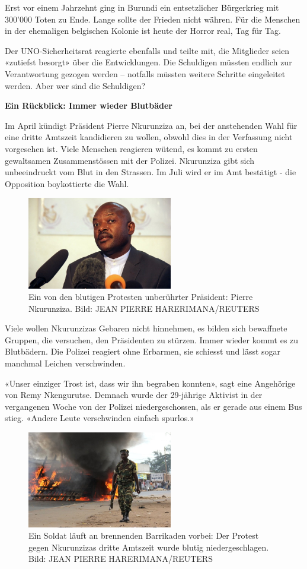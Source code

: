 \documentclass{article}
\begin{document}
	Erst vor einem Jahrzehnt ging in Burundi ein entsetzlicher Bürgerkrieg mit 300'000 Toten zu Ende. Lange sollte der Frieden nicht währen. Für die Menschen in der ehemaligen belgischen Kolonie ist heute der Horror real, Tag für Tag.
	
	Der UNO-Sicherheitsrat reagierte ebenfalls und teilte mit, die Mitglieder seien «zutiefst besorgt» über die Entwicklungen. Die Schuldigen müssten endlich zur Verantwortung gezogen werden – notfalls müssten weitere Schritte eingeleitet werden. Aber wer sind die Schuldigen?
	
	\textbf{Ein Rückblick: Immer wieder Blutbäder}
	
	Im April kündigt Präsident Pierre Nkurunziza an, bei der anstehenden Wahl für eine dritte Amtszeit kandidieren zu wollen, obwohl dies in der Verfassung nicht vorgesehen ist. Viele Menschen reagieren wütend, es kommt zu ersten gewaltsamen Zusammenstössen mit der Polizei. Nkurunziza gibt sich unbeeindruckt vom Blut in den Strassen. Im Juli wird er im Amt bestätigt - die Opposition boykottierte die Wahl.
	
	
	\begin{figure}
		  \centering
		\includegraphics[width=180pt]{img/img3}
		\caption{Ein von den blutigen Protesten unberührter Präsident: Pierre Nkurunziza. Bild: JEAN PIERRE HARERIMANA/REUTERS}
	\end{figure}
	
	Viele wollen Nkurunzizas Gebaren nicht hinnehmen, es bilden sich bewaffnete Gruppen, die versuchen, den Präsidenten zu stürzen. Immer wieder kommt es zu Blutbädern. Die Polizei reagiert ohne Erbarmen, sie schiesst und lässt sogar manchmal Leichen verschwinden.
	
	«Unser einziger Trost ist, dass wir ihn begraben konnten», sagt eine Angehörige von Remy Nkengurutse. Demnach wurde der 29-jährige Aktivist in der vergangenen Woche von der Polizei niedergeschossen, als er gerade aus einem Bus stieg. «Andere Leute verschwinden einfach spurlos.»
	
	\begin{figure}
		  \centering
		\includegraphics[width=180pt]{img/img4}
		\caption{Ein Soldat läuft an brennenden Barrikaden vorbei: Der Protest gegen Nkurunzizas dritte Amtszeit wurde blutig niedergeschlagen. Bild: JEAN PIERRE HARERIMANA/REUTERS}
	\end{figure}
	
\end{document}

